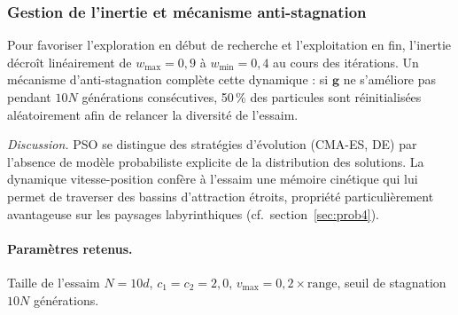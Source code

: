 \subsubsection{Gestion de l'inertie et mécanisme anti-stagnation}
Pour favoriser l'exploration en début de recherche et l'exploitation en fin,
l'inertie décroît linéairement de $w_{\max} = 0{,}9$ à $w_{\min} = 0{,}4$
au cours des itérations.  Un mécanisme d'anti-stagnation complète cette
dynamique : si $\mathbf{g}$ ne s'améliore pas pendant $10N$ générations
consécutives, 50\,\% des particules sont réinitialisées aléatoirement afin
de relancer la diversité de l'essaim.

\emph{Discussion.}  PSO se distingue des stratégies d'évolution (CMA-ES, DE)
par l'absence de modèle probabiliste explicite de la distribution des
solutions.  La dynamique vitesse-position confère à l'essaim une mémoire
cinétique qui lui permet de traverser des bassins d'attraction étroits,
propriété particulièrement avantageuse sur les paysages labyrinthiques
(cf.\ section~\ref{sec:prob4}).

\paragraph{Paramètres retenus.}
Taille de l'essaim $N = 10d$, $c_1 = c_2 = 2{,}0$, $v_{\max} = 0{,}2
\times \text{range}$, seuil de stagnation $10N$ générations.
